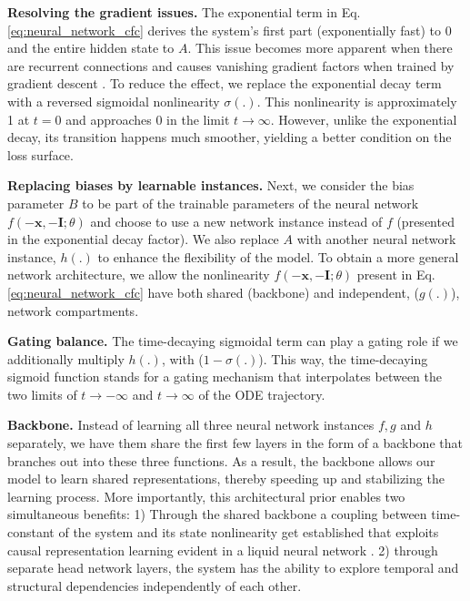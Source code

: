 \documentclass[12pt]{article}
\begin{document}
\noindent \textbf{Resolving the gradient issues.} The exponential term in Eq. \ref{eq:neural_network_cfc} derives the system's first part (exponentially fast) to 0 and the entire hidden state to $A$. This issue becomes more apparent when there are recurrent connections and causes vanishing gradient factors when trained by gradient descent \cite{hochreiter1991untersuchungen}. To reduce the effect, we replace the exponential decay term with a reversed sigmoidal nonlinearity $\sigma(.)$. This nonlinearity is approximately 1 at $t=0$ and approaches 0 in the limit $t\rightarrow \infty$. However, unlike the exponential decay, its transition happens much smoother, yielding a better condition on the loss surface.

\noindent \textbf{Replacing biases by learnable instances.} Next, we consider the bias parameter $B$ to be part of the trainable parameters of the neural network $f(-\textbf{x}, -\textbf{I}; \theta)$ and choose to use a new network instance instead of $f$ (presented in the exponential decay factor). We also replace $A$ with another neural network instance, $h(.)$ to enhance the flexibility of the model. To obtain a more general network architecture, we allow the nonlinearity $f(-\textbf{x}, -\textbf{I}; \theta)$ present in Eq. \ref{eq:neural_network_cfc} have both shared (backbone) and independent, ($g(.)$), network compartments.

\noindent \textbf{Gating balance.} The time-decaying sigmoidal term can play a gating role if we additionally multiply $h(.)$, with ($1 - \sigma(.)$). This way, the time-decaying sigmoid function stands for a gating mechanism that interpolates between the two limits of $t\rightarrow -\infty$ and $t\rightarrow \infty$ of the ODE trajectory. 

\noindent \textbf{Backbone.} Instead of learning all three neural network instances $f, g$ and $h$ separately, we have them share the first few layers in the form of a backbone that branches out into these three functions. As a result, the backbone allows our model to learn shared representations, thereby speeding up and stabilizing the learning process. More importantly, this architectural prior enables two simultaneous benefits: 1) Through the shared backbone a coupling between time-constant of the system and its state nonlinearity get established that exploits causal representation learning evident in a liquid neural network  \cite{hasani2021liquid,vorbach2021causal}. 2) through separate head network layers, the system has the ability to explore temporal and structural dependencies independently of each other.  
\end{document}
